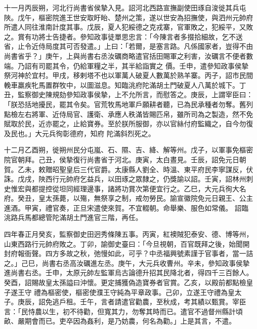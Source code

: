 \begin{pinyinscope}
 十一月丙辰朔，河北行尚書省侯摯入見。詔河北西路宣撫副使田琢自浚徙其兵屯陜。戊午，樞密院進王世安取盱眙、楚州之策，遂以世安為招撫使，與泗州元帥府所遣人同往淮南計度其事。戊辰，夏人犯綏德之克戎寨，官軍敗之，犯綏平，又敗之。賞有功將士告捷者。參知政事徒單思忠言：「今陳言者多掇拾細故，乞不送省，止令近侍局度其可否發遣。」上曰：「若爾，是塞言路。凡係國家者，豈得不由尚書省乎？」庚午，上與尚書右丞汝礪商略遣官括田賜軍之利害，汝礪言不便者數端。乃詔有司罷其令，仍給軍糧之半，其半給詣實之
 價。壬申，遣參知政事侯摯祭河神於宜村。甲戌，移剌塔不也以軍萬人破夏人數萬於熟羊寨。丙子，詔市民間輓車羸疾牝馬置群牧中，以圖滋息。知臨洮府陀滿胡土門破夏人八萬於城下。丁丑，監察御史陳規劾參知政事侯摯，上不允所言，而慰答之。庚辰，上謂宰臣曰：「朕恐括地擾民，罷其令矣。官荒牧馬地軍戶願耕者聽，已為民承種者勿奪。舊列點檢左右將軍、近侍局官、護衛、承應人秩滿皆賜匹帛，雖所司為之製造，然不免賦取於民，近亦罷之，止給寶券。至於朕所服御，亦以官絲付府監織之，自今勿復及民也。」大元兵徇彰德府，知府
 陀滿斜烈死之。



 十二月乙酉朔，徙朔州民分屯嵐、石、隰、吉、絳、解等州。戊子，以軍事免樞密院官朝拜。己丑，侯摯復行尚書省于河北。庚寅，太白晝見。壬辰，詔免元日朝賀。乙未，敕贈昭聖皇后三代官爵。太康縣人劉全、時溫、東平府民李寧謀反，伏誅。戊戌，陜西行元帥府乞益兵，以田琢之眾隸之，仍獎諭以詔。壬寅，詔林州刺史惟宏與都提控從坦同經理邊事，諸將功賞次第便宜行之。乙巳，大元兵徇大名府。癸丑，皇太孫薨，以殤，無祭享之制，戒勿勞民。諭宣徽院免元日親王、公主進酒。甲寅，禮官奏，正旦宋遣使來賀。不宜輟朝。命舉樂、服色如常儀。
 詔臨洮路兵馬都總管陀滿胡土門進官三階，再任。



 四年春正月癸亥，監察御史田迥秀條陳五事。丙寅，紅襖賊犯泰安、德、博等州，山東西路行元帥府敗之。丁卯，諭御史臺曰：「今旦視朝，百官既拜之後，始聞開封府報衙聲。四方多故之秋，弛慢如此，可乎？中丞福興號素謹于官事者，當一詰之。」己巳，尚書右丞高汝礪進左丞。庚午，大元兵收曹州。辛未，參知政事侯摯進尚書右丞。壬申，太原元帥左監軍烏古論德升招其民降北者，得四千三百餘人。癸酉，詔賜故皇太孫謚曰沖懷。更定捕獲偽造寶券者官賞。乙亥，以殿前都點檢皇子遂王守
 禮為樞密使，樞密使濮王守純為平章政事。己卯，立遂王守禮為皇太子。庚辰，詔免逃戶租。壬午，言者請遣官勸農，至秋成，考其績以甄賞。宰臣言：「民恃農以生，初不待勸，但寬其力，勿奪其時而已。遣官不過督州縣計頃畝、嚴期會而已。吏卒因為姦利，是乃妨農，何名為勸。」上是其言，不遣。




\end{pinyinscope}
